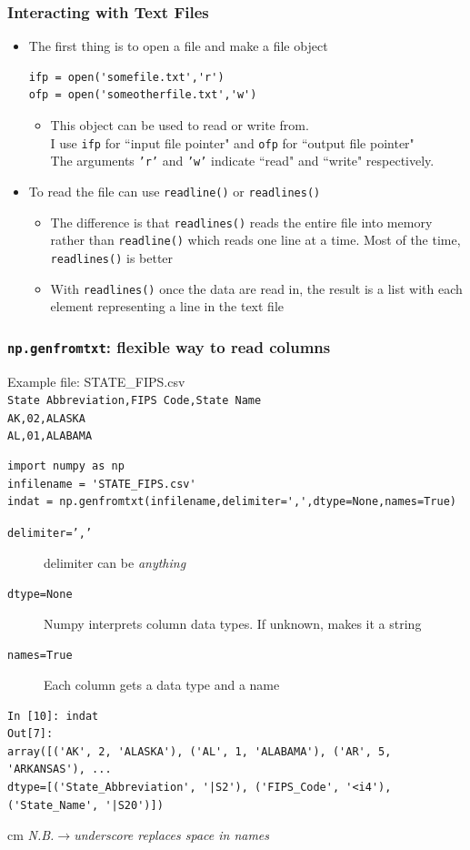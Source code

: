 \documentclass{beamer}
\begin{document}
\begin{frame}[fragile]
\frametitle{Interacting with Text Files}
\begin{itemize}
\item The first thing is to open a file and make a file object
\begin{lstlisting}
ifp = open('somefile.txt','r')
ofp = open('someotherfile.txt','w')
\end{lstlisting}
\begin{itemize}
\item This object can be used to read or write from. \\I use \texttt{ifp} for ``input file pointer" and \texttt{ofp} for ``output file pointer" \\
The arguments \texttt{'r'} and \texttt{'w'} indicate ``read" and ``write" respectively.
\end{itemize}
\item To read the file can use \texttt{readline()} or \texttt{readlines()}\\
\begin{itemize}
\item The difference is that  \texttt{readlines()} reads the entire file into memory rather than  \texttt{readline()}  which reads one line at a time. Most of the time,  \texttt{readlines()}  is better
\item With \texttt{readlines()}  once the data are read in, the result is a list with each element representing a line in the text file
  
\end{itemize}
\end{itemize}
\end{frame}


\begin{frame}[fragile]
\frametitle{\texttt{np.genfromtxt}: flexible way to read columns}
Example file: STATE\_FIPS.csv \\
\texttt{State Abbreviation,FIPS Code,State Name} \\
\texttt{AK,02,ALASKA} \\
\texttt{AL,01,ALABAMA}  \\
\pause
\begin{lstlisting}
import numpy as np
infilename = 'STATE_FIPS.csv'
indat = np.genfromtxt(infilename,delimiter=',',dtype=None,names=True)
\end{lstlisting}
\pause
\begin{description}
\item[\texttt{delimiter=','}] delimiter can be \emph{anything}
\item[\texttt{dtype=None}] Numpy interprets column data types. If unknown, makes it a string
\item[\texttt{names=True}] Each column gets a data type and a name
\end{description}
\pause
\begin{lstlisting}
In [10]: indat
Out[7]: 
array([('AK', 2, 'ALASKA'), ('AL', 1, 'ALABAMA'), ('AR', 5, 'ARKANSAS'), ... 
dtype=[('State_Abbreviation', '|S2'), ('FIPS_Code', '<i4'), ('State_Name', '|S20')])
\end{lstlisting}
\pause
{} cm \emph{N.B.$\rightarrow$underscore replaces space in names}
\end{frame}
\end{document}
